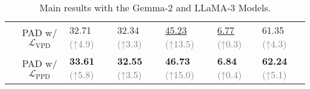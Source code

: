 \begin{table*}[htbp]
\begin{tabular*}{\textwidth}{cc ll lll}
& PAD w/ $\mathcal{L}_\text{VPD}$ & 32.71 \textcolor{gray}{\scriptsize{(↑4.9})} & 32.34 \textcolor{gray}{\scriptsize{(↑3.3})} & \underline{45.23} \textcolor{gray}{\scriptsize{(↑13.5})} & \underline{6.77} \textcolor{gray}{\scriptsize{(↑0.3})} & 61.35 \textcolor{gray}{\scriptsize{(↑4.3})} \\
& PAD w/ $\mathcal{L}_\text{PPD}$  & \textbf{33.61} \textcolor{gray}{\scriptsize{(↑5.8})} & \textbf{32.55} \textcolor{gray}{\scriptsize{(↑3.5})} & \textbf{46.73} \textcolor{gray}{\scriptsize{(↑15.0})} & \textbf{6.84} \textcolor{gray}{\scriptsize{(↑0.4})} & \textbf{62.24} \textcolor{gray}{\scriptsize{(↑5.1})} \\
\bottomrule
\end{tabular*}
\vspace{-3mm}
\caption{Main results with the Gemma-2 and LLaMA-3 Models.}
\vspace{-5mm}
\label{tab:main}
\end{table*}
